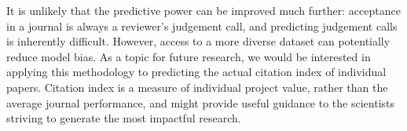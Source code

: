 \documentclass[11pt]{article}
\begin{document}
It is unlikely that the predictive power can be improved much further: acceptance in a journal is always a reviewer's judgement call, and predicting judgement calls is inherently difficult. However, access to a more diverse dataset can potentially reduce model bias. As a topic for future research, we would be interested in applying this methodology to predicting the actual citation index of individual papers. Citation index is a measure of individual project value, rather than the average journal performance, and might provide useful guidance to the scientists striving to generate the most impactful research. 



\end{document}
